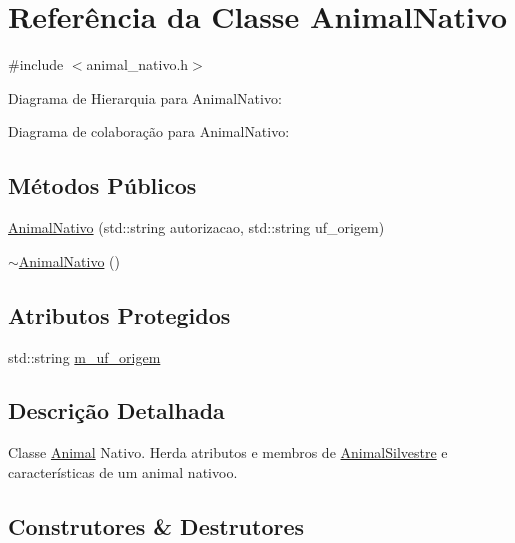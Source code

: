 \hypertarget{classAnimalNativo}{}\section{Referência da Classe Animal\+Nativo}
\label{classAnimalNativo}


{\ttfamily \#include $<$animal\+\_\+nativo.\+h$>$}



Diagrama de Hierarquia para Animal\+Nativo\+:


Diagrama de colaboração para Animal\+Nativo\+:
\subsection*{Métodos Públicos}
\begin{DoxyCompactItemize}
\item 
\hyperlink{classAnimalNativo_a0d44e48771b776794982f3812f8b0379}{Animal\+Nativo} (std\+::string autorizacao, std\+::string uf\+\_\+origem)
\item 
\hyperlink{classAnimalNativo_a365f41847e6c472b7c549f0c927929d5}{$\sim$\+Animal\+Nativo} ()
\end{DoxyCompactItemize}
\subsection*{Atributos Protegidos}
\begin{DoxyCompactItemize}
\item 
std\+::string \hyperlink{classAnimalNativo_a5ee01fe0f43cac32ad2b729e99e036b3}{m\+\_\+uf\+\_\+origem}
\end{DoxyCompactItemize}


\subsection{Descrição Detalhada}
Classe \hyperlink{classAnimal}{Animal} Nativo. Herda atributos e membros de \hyperlink{classAnimalSilvestre}{Animal\+Silvestre} e características de um animal nativoo. 

\subsection{Construtores \& Destrutores}
\mbox{\label{classAnimalNativo_a0d44e48771b776794982f3812f8b0379}} 

